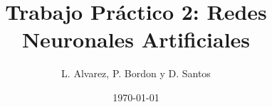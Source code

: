 \documentclass[onecolumn,10pt]{article}
\begin{document}
 

\title{Trabajo Práctico 2: Redes Neuronales Artificiales}

\author{L. Alvarez, P. Bordon y D. Santos}

\date{\today}


\maketitle


\newpage

\tableofcontents

\newpage






\end{document}
